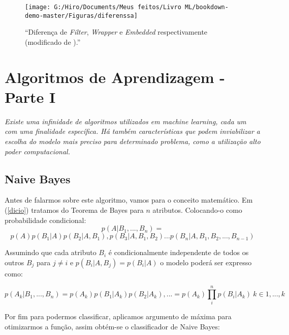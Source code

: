 \documentclass[
]{book}
\begin{document}
\begin{figure}

{\centering \texttt{[image: G:/Hiro/Documents/Meus feitos/Livro ML/bookdown-demo-master/Figuras/diferenssa]} 

}

\caption{``Diferença de \emph{Filter}, \emph{Wrapper} e \emph{Embedded} respectivamente (modificado de \citet{covoes2010seleccao}).''}\label{fig:diferenssa}
\end{figure}



\hypertarget{Algoritmosaprendizagem}{%
\chapter{Algoritmos de Aprendizagem - Parte I}\label{Algoritmosaprendizagem}}

\emph{Existe uma infinidade de algoritmos utilizados em machine learning, cada um com uma finalidade específica. Há também características que podem inviabilizar a escolha do modelo mais preciso para determinado problema, como a utilização alto poder computacional.}

\hypertarget{naive-bayes}{%
\section{Naive Bayes}\label{naive-bayes}}

Antes de falarmos sobre este algoritmo, vamos para o conceito matemático. Em (\ref{dicio}) tratamos do Teorema de Bayes para \(n\) atributos. Colocando-o como probabilidade condicional:
\[p(A|B_{1},...,B_{n}) = \]
\begin{equation} 
  p(A)p(B_{1}|A)p(B_{2}|A,B_{1}),p(B_{3}|A,B_{1},B_{2})...p(B_{n}|A,B_{1},B_{2},...,B_{n−1})
  \label{eq:bayescond}
\end{equation}

Assumindo que cada atributo \(B_i\) é condicionalmente independente de todos os outros \(B_j\) para \(j\neq i\) e \(p(B_i|A,B_j)=p(B_i|A)\) o modelo poderá ser expresso como:

\begin{equation} 
  p(A_k|B_1,...,B_n)=p(A_k)p(B_1|A_k)p(B_2|A_k),...=p(A_k)\prod_i^n p(B_i|A_k) \ k ∈{1,...,k}
  \label{eq:bayesprodutorio}
\end{equation}

Por fim para podermos classificar, aplicamos argumento de máxima para otimizarmos a função, assim obtém-se o classificador de Naive Bayes:
\end{document}
